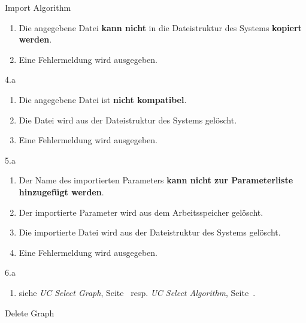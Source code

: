 \begin{usecase}{Import Algorithm}
{\begin{enumerate}
			\item Die angegebene Datei \textbf{kann nicht} in die Dateistruktur des Systems \textbf{kopiert werden}.
			\item Eine Fehlermeldung wird ausgegeben.
		    \end{enumerate}
	    \item[4.a]
		    \begin{enumerate}
			\item Die angegebene Datei ist \textbf{nicht kompatibel}.
			\item Die Datei wird aus der Dateistruktur des Systems gel\"oscht.
			\item Eine Fehlermeldung wird ausgegeben.
		    \end{enumerate}
	    \item[5.a]
		    \begin{enumerate}
			\item Der Name des importierten Parameters \textbf{kann nicht zur Parameterliste hinzugef\"ugt werden}.
			\item Der importierte Parameter wird aus dem Arbeitsspeicher gel\"oscht.
			\item Die importierte Datei wird aus der Dateistruktur des Systems gel\"oscht.
			\item Eine Fehlermeldung wird ausgegeben.
		    \end{enumerate}
	    \item[6.a]
		    \begin{enumerate}
			\item siehe \textit{UC Select Graph}, Seite~\pageref{uc:Select Graph} resp. \textit{UC Select Algorithm}, Seite~\pageref{uc:Select Algorithm}.
		    \end{enumerate}
    }
\end{usecase}
\newpage 
% 
\begin{usecase}{Delete Graph}
    \mainsuccess{
	    \item 
    }
    \extensions{
	    \item[1.a]
		    \begin{enumerate}
			\item 
		    \end{enumerate}
    }
\end{usecase}
